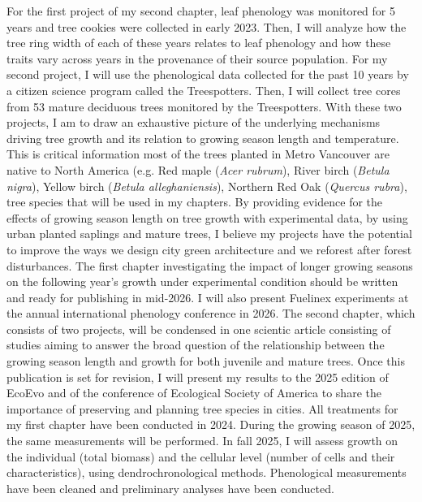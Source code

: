 \documentclass[11pt,letter]{article}
\begin{document}
For the first project of my second chapter, leaf phenology was monitored for 5 years and tree cookies were collected in early 2023. Then, I will analyze how the tree ring width of each of these years relates to leaf phenology and how these traits vary across years in the provenance of their source population. For my second project, I will use the phenological data collected for the past 10 years by a citizen science program called the Treespotters. Then, I will collect tree cores from 53 mature deciduous trees monitored by the Treespotters. With these two projects, I am to draw an exhaustive picture of the underlying mechanisms driving tree growth and its relation to growing season length and temperature. This is critical information most of the trees planted in Metro Vancouver are native to North America (e.g. Red maple (\textit{Acer rubrum}), River birch (\textit{Betula nigra}), Yellow birch (\textit{Betula alleghaniensis}), Northern Red Oak (\textit{Quercus rubra}), tree species that will be used in my chapters. By providing evidence for the effects of growing season length on tree growth with experimental data, by using urban planted saplings and mature trees, I believe my projects have the potential to improve the ways we design city green architecture and we reforest after forest disturbances. 
The first chapter investigating the impact of longer growing seasons on the following year’s growth under experimental condition should be written and ready for publishing in mid-2026. I will also present Fuelinex experiments at the annual international phenology conference in 2026.
The second chapter, which consists of two projects, will be condensed in one scientic article consisting of studies aiming to answer the broad question of the relationship between the growing season length and growth for both juvenile and mature trees. Once this publication is set for revision, I will present my results to the 2025 edition of EcoEvo and of the conference of Ecological Society of America to share the importance of preserving and planning tree species in cities.
All treatments for my first chapter have been conducted in 2024. During the growing season of 2025, the same measurements will be performed. In fall 2025, I will assess growth on the individual (total biomass) and the cellular level (number of cells and their characteristics), using dendrochronological methods. Phenological measurements have been cleaned and preliminary analyses have been conducted.
\end{document}
